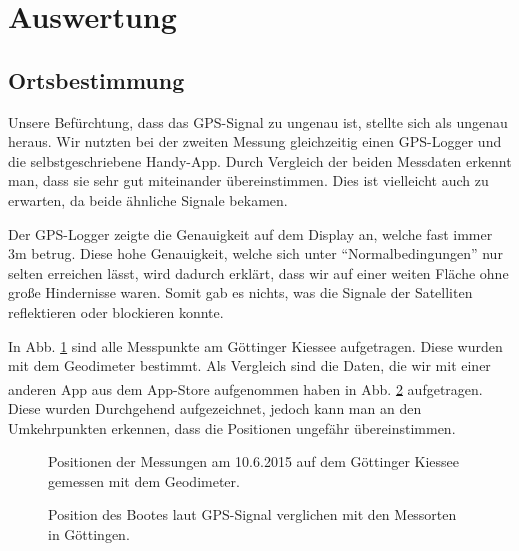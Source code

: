 \documentclass[12pt,a4paper,titlepage,headinclude,bibtotoc]{scrartcl}
\begin{document}
\section{Auswertung}
\label{sec:auswertung}

\subsection{Ortsbestimmung}

Unsere Befürchtung, dass das GPS-Signal zu ungenau ist, stellte sich als ungenau heraus.
Wir nutzten bei der zweiten Messung gleichzeitig einen GPS-Logger und die selbstgeschriebene Handy-App.
Durch Vergleich der beiden Messdaten erkennt man, dass sie sehr gut miteinander übereinstimmen.
Dies ist vielleicht auch zu erwarten, da beide ähnliche Signale bekamen.

Der GPS-Logger zeigte die Genauigkeit auf dem Display an, welche fast immer 3m betrug.
Diese hohe Genauigkeit, welche sich unter "`Normalbedingungen"' nur selten erreichen lässt, wird dadurch erklärt, dass wir auf einer weiten Fläche ohne große Hindernisse waren.
Somit gab es nichts, was die Signale der Satelliten reflektieren oder blockieren konnte.


In Abb. \ref{fig:einzelGPSGoe} sind alle Messpunkte am Göttinger Kiessee aufgetragen.
Diese wurden mit dem Geodimeter bestimmt.
Als Vergleich sind die Daten, die wir mit einer anderen App aus dem App-Store\textsuperscript{\textregistered}  aufgenommen haben in Abb. \ref{fig:GPSGoe} aufgetragen.
Diese wurden Durchgehend aufgezeichnet, jedoch kann man an den Umkehrpunkten erkennen, dass die Positionen ungefähr übereinstimmen.

\begin{figure}[h]
\centering

\caption{Positionen der Messungen am 10.6.2015 auf dem Göttinger Kiessee gemessen mit dem Geodimeter.}
\label{fig:einzelGPSGoe}
\end{figure}
\begin{figure}[h]
\centering

\caption{Position des Bootes laut GPS-Signal verglichen mit den Messorten in Göttingen.}
\label{fig:GPSGoe}
\end{figure}
\end{document}

